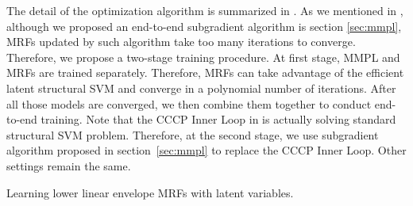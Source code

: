 The detail of the optimization algorithm is summarized in
. As we mentioned in
, although we proposed an end-to-end
subgradient algorithm is section \ref{sec:mmpl}, MRFs updated by
such algorithm take too many iterations to converge. Therefore,
we propose a two-stage training procedure. At first stage, MMPL
and MRFs are trained separately. Therefore, MRFs can take
advantage of the efficient latent structural SVM and converge in
a polynomial number of iterations. After all those models are
converged, we then combine them together to conduct end-to-end
training. Note that the CCCP Inner Loop in
 is actually solving standard structural
SVM problem. Therefore, at the second stage, we use subgradient
algorithm proposed in section~\ref{sec:mmpl} to replace the CCCP
Inner Loop. Other settings remain the same.


\begin{algorithm}[h]
  \begin{algorithmic}[1]
    \REPEAT {}
    \ENDFOR

    \REPEAT {}


    \ENDIF
    \ENDFOR

  \end{algorithmic}
  \caption{\label{alg:learning_app} Learning lower linear envelope
    MRFs with latent variables.}
\end{algorithm}

